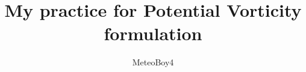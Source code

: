\documentclass[12pt]{article}
\numberwithin{equation}{section}
\begin{document}
\title{My practice for Potential Vorticity formulation}
\author{MeteoBoy4}
\maketitle
\end{document}
